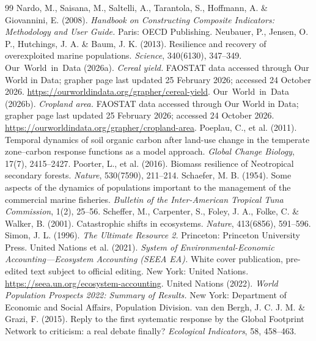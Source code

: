 \documentclass[preprint,12pt,authoryear]{elsarticle}
\begin{document}
\begin{thebibliography}{99}
 Nardo, M., Saisana, M., Saltelli, A., Tarantola, S., Hoffmann, A. \& Giovannini, E. (2008). \emph{Handbook on Constructing Composite Indicators: Methodology and User Guide.} Paris: OECD Publishing.
 Neubauer, P., Jensen, O. P., Hutchings, J. A. \& Baum, J. K. (2013). Resilience and recovery of overexploited marine populations. \emph{Science}, 340(6130), 347--349.
 Our~World~in~Data (2026a). \emph{Cereal yield.} FAOSTAT data accessed through Our World in Data; grapher page last updated 25 February 2026; accessed 24 October 2026. \url{https://ourworldindata.org/grapher/cereal-yield}.
 Our~World~in~Data (2026b). \emph{Cropland area.} FAOSTAT data accessed through Our World in Data; grapher page last updated 25 February 2026; accessed 24 October 2026. \url{https://ourworldindata.org/grapher/cropland-area}.
 Poeplau, C., et al. (2011). Temporal dynamics of soil organic carbon after land-use change in the temperate zone--carbon response functions as a model approach. \emph{Global Change Biology}, 17(7), 2415--2427.
 Poorter, L., et al. (2016). Biomass resilience of Neotropical secondary forests. \emph{Nature}, 530(7590), 211--214.
 Schaefer, M. B. (1954). Some aspects of the dynamics of populations important to the management of the commercial marine fisheries. \emph{Bulletin of the Inter-American Tropical Tuna Commission}, 1(2), 25--56.
 Scheffer, M., Carpenter, S., Foley, J. A., Folke, C. \& Walker, B. (2001). Catastrophic shifts in ecosystems. \emph{Nature}, 413(6856), 591--596.
 Simon, J. L. (1996). \emph{The Ultimate Resource 2.} Princeton: Princeton University Press.
 United Nations et al. (2021). \emph{System of Environmental-Economic Accounting---Ecosystem Accounting (SEEA EA).} White cover publication, pre-edited text subject to official editing. New York: United Nations. \url{https://seea.un.org/ecosystem-accounting}.
 United Nations (2022). \emph{World Population Prospects 2022: Summary of Results.} New York: Department of Economic and Social Affairs, Population Division.
 van den Bergh, J. C. J. M. \& Grazi, F. (2015). Reply to the first systematic response by the Global Footprint Network to criticism: a real debate finally? \emph{Ecological Indicators}, 58, 458--463.

\end{thebibliography}
\end{document}
